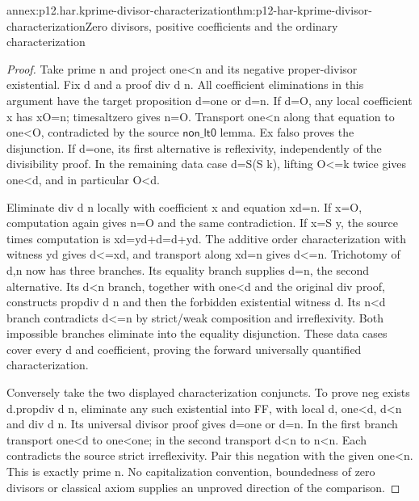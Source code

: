 \begin{annexitem}{annex:p12.har.kprime-divisor-characterization}{thm:p12-har-kprime-divisor-characterization}{Zero divisors, positive coefficients and the ordinary characterization}
\begin{proof}
Take prime n and project one<n and its negative proper-divisor
existential. Fix d and a proof div d n. All coefficient eliminations
in this argument have the target proposition d=one or d=n.
If d=O, any local coefficient x has xO=n; timesaltzero gives n=O.
Transport one<n along that equation to one<O, contradicted by the
source \(\mathsf{non\_lt0}\) lemma. Ex falso proves the disjunction.
If d=one, its first alternative is reflexivity, independently of the
divisibility proof. In the remaining data case d=S(S k), lifting
O<=k twice gives one<d, and in particular O<d.

Eliminate div d n locally with coefficient x and equation xd=n.
If x=O, computation again gives n=O and the same contradiction.
If x=S y, the source times computation is xd=yd+d=d+yd.
The additive order characterization with witness yd gives d<=xd,
and transport along xd=n gives d<=n. Trichotomy of d,n now has
three branches. Its equality branch supplies d=n, the second alternative.
Its d<n branch, together with one<d and the original div proof,
constructs propdiv d n and then the forbidden existential witness d.
Its n<d branch contradicts d<=n by strict/weak composition and
irreflexivity. Both impossible branches eliminate into the equality
disjunction. These data cases cover every d and coefficient, proving
the forward universally quantified characterization.

Conversely take the two displayed characterization conjuncts.
To prove neg exists d.propdiv d n, eliminate any such existential
into FF, with local d, one<d, d<n and div d n. Its universal
divisor proof gives d=one or d=n. In the first branch transport
one<d to one<one; in the second transport d<n to n<n.
Each contradicts the source strict irreflexivity. Pair this negation
with the given one<n. This is exactly prime n. No capitalization
convention, boundedness of zero divisors or classical axiom supplies
an unproved direction of the comparison.
\end{proof}
\end{annexitem}

